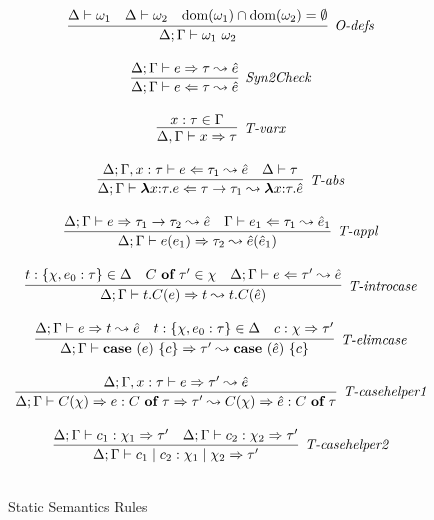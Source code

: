 \begin{figure}
\[\begin{array}{c}
\infer[\textit{O-defs}]
	{\Delta; \Gamma \vdash \omega_1\ \omega_2  }
	{\Delta \vdash \omega_1 & \Delta \vdash \omega_2 & \text{dom}(\omega_1) \intersect \text{dom}(\omega_2) = \emptyset } \\[3ex]

\infer[\textit{Syn2Check}]
	{\Delta; \Gamma \vdash  e \Leftarrow \tau \leadsto \hat{e}} 
	{\Delta;\Gamma \vdash e \Rightarrow \tau \leadsto \hat{e}   }\\[3ex]
	
\infer[\textit{T-varx}]
	{\Delta,\Gamma \vdash x\Rightarrow\tau } 
	{x:\tau \in \Gamma }\\[3ex]

\infer[\textit{T-abs}]
	{\Delta; \Gamma \vdash  \boldsymbol\lambda x{:}\tau . e \Leftarrow \tau \rightarrow \tau_1 \leadsto \boldsymbol\lambda x{:}\tau .\hat{e}} 
	{\Delta; \Gamma, x:\tau \vdash e\Leftarrow \tau_1 \leadsto \hat{e}  & \Delta\vdash \tau}\\[3ex]

\infer[\textit{T-appl}]
	{\Delta; \Gamma \vdash  e(e_1) \Rightarrow \tau_2  \leadsto \hat{e}(\hat{e}_1) } 
	{\Delta; \Gamma \vdash e \Rightarrow \tau_1 \rightarrow \tau_2  \leadsto \hat{e}  & \Gamma \vdash e_1 \Leftarrow \tau_1 \leadsto \hat{e}_1 }\\[3ex]

\infer[\textit{T-introcase}]
	{\Delta; \Gamma \vdash  t.C(e) \Rightarrow t  \leadsto t.C(\hat{e}) } 
	{t:\{\chi, e_0:\tau\} \in \Delta & C\ \keyw{of}\ \tau' \in \chi &\Delta; \Gamma \vdash e \Leftarrow \tau'  \leadsto \hat{e}}\\[3ex]

\infer[\textit{T-elimcase}]
	{\Delta; \Gamma \vdash  \keyw{case}~(e)~\{ c \} \Rightarrow \tau'  \leadsto \keyw{case}~(\hat{e})~\{ c \} } 
	{\Delta; \Gamma \vdash e \Rightarrow t  \leadsto \hat{e}  & t:\{ \chi,e_0:\tau\} \in \Delta & c:\chi \Rightarrow \tau'}\\[3ex]

\infer[\textit{T-casehelper1}]
	{\Delta; \Gamma \vdash  C(\chi)\Rightarrow e : C\ \keyw{of}\ \tau \Rightarrow \tau' \leadsto C(\chi)\Rightarrow \hat{e} : C\ \keyw{of}\ \tau} 
	{\Delta; \Gamma, x:\tau \vdash e \Rightarrow \tau' \leadsto \hat{e}}\\[3ex]

\infer[\textit{T-casehelper2}]
	{\Delta; \Gamma \vdash  c_1 \bnfalt c_2: \chi_1 \bnfalt \chi_2 \Rightarrow \tau' } 
	{\Delta; \Gamma \vdash c_1:\chi_1 \Rightarrow \tau' & \Delta; \Gamma \vdash c_2:\chi_2 \Rightarrow \tau'}\\[3ex]


\end{array}
\]
\label{fig:statics1}
\caption{Static Semantics Rules}
\end{figure}

